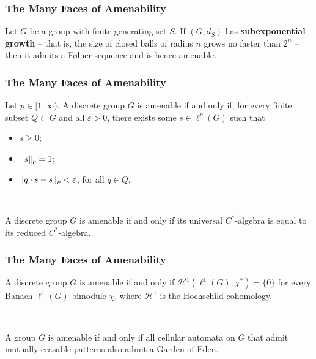 \documentclass{beamer}
\DeclarePairedDelimiter{\norm}{\lVert}{\rVert}
\begin{document}
\begin{frame}
\frametitle{The Many Faces of Amenability}
\begin{corollary}
Let $G$ be a group with finite generating set $S$. If $(G, d_S)$ has \textbf{subexponential growth} -- that is, the size of closed balls of radius $n$ grows no faster than $2^n$ -- then it admits a F{\o}lner sequence and is hence amenable.
\end{corollary}
\end{frame}

\begin{frame}
\frametitle{The Many Faces of Amenability}
\begin{theorem}
Let $p \in [1, \infty)$. A discrete group $G$ is amenable if and only if, for every finite subset $Q \subset G$ and all $\varepsilon > 0$, there exists some $s \in \ell^p(G)$ such that
\begin{itemize}
\item $s \geq 0$;
\item $\norm{s}_p = 1$;
\item $\norm{q \cdot s - s}_p < \varepsilon$, for all $q \in Q$.
\end{itemize}
\end{theorem}
\noindent\\[0.5\baselineskip]
\begin{theorem}
A discrete group $G$ is amenable if and only if its universal $C^*$-algebra is equal to its reduced $C^*$-algebra.
\end{theorem}
\end{frame}

\begin{frame}
\frametitle{The Many Faces of Amenability}
\begin{theorem}[Johnson, 1972]
A discrete group $G$ is amenable if and only if $\mathcal{H}^1(\ell^1(G), \chi^*) = \{0\}$ for every Banach $\ell^1(G)$-bimodule $\chi$, where $\mathcal{H}^1$ is the Hochschild cohomology.
\end{theorem}
\noindent\\[0.5\baselineskip]
\begin{theorem}[Bartholdi, 2010]
A group $G$ is amenable if and only if all cellular automata on $G$ that admit mutually erasable patterns also admit a Garden of Eden.
\end{theorem}
\end{frame}

\end{document}
